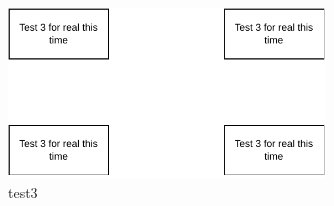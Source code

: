 \begin{figure}[!htbp]
    \centering
    \includegraphics[width=0.75\textwidth]{img/diagrams/pdf/test3.drawio.pdf}
    \caption[test3]{test3}
    \label{fig:test3.drawio.pdf}
\end{figure}
    